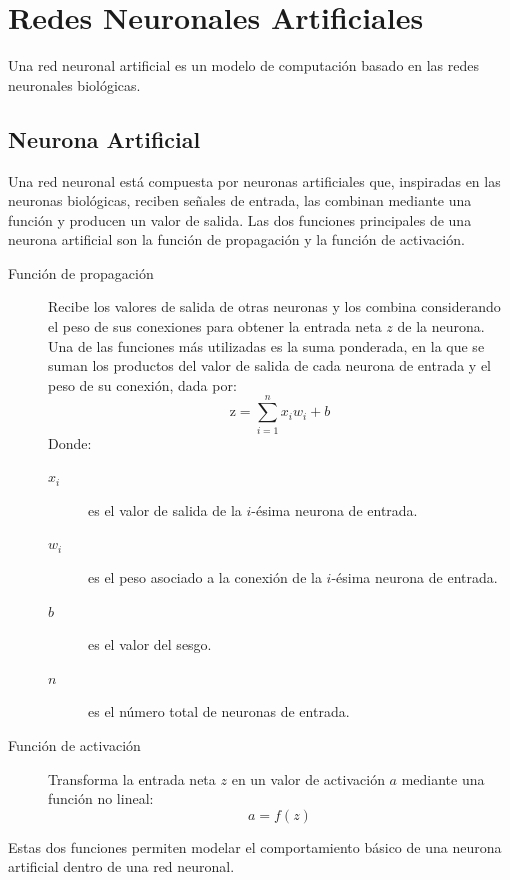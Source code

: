 \section{Redes Neuronales Artificiales}
Una red neuronal artificial es un modelo de computación basado en las redes neuronales biológicas.

\subsection{Neurona Artificial}
Una red neuronal está compuesta por neuronas artificiales que, inspiradas en las
neuronas biológicas, reciben señales de entrada, las combinan mediante una función
y producen un valor de salida. Las dos funciones principales de una neurona artificial
son la función de propagación y la función de activación.

\begin{description}
    \item[Función de propagación] Recibe los valores de salida de otras neuronas y los combina 
    considerando el peso de sus conexiones para obtener la entrada neta $z$ de la neurona.
    Una de las funciones más utilizadas es la suma ponderada, en la que se suman los productos 
    del valor de salida de cada neurona de entrada y el peso de su conexión, dada por:
    \begin{equation}
        \text{z} = \sum_{i=1}^{n}x_{i} w_{i} + b
    \end{equation}
    Donde:
    \begin{description}
        \item[$x_{i}$] es el valor de salida de la $i$-ésima neurona de entrada.
        \item[$w_{i}$] es el peso asociado a la conexión de la $i$-ésima neurona de entrada.
        \item[$b$] es el valor del sesgo.
        \item[$n$] es el número total de neuronas de entrada.
    \end{description}
    \item[Función de activación] Transforma la entrada neta $z$ en un valor de activación
    $a$ mediante una función no lineal:
    \begin{equation}
        a = f(z)
    \end{equation}
\end{description}

Estas dos funciones permiten modelar el comportamiento básico de una neurona artificial dentro de una red neuronal.

